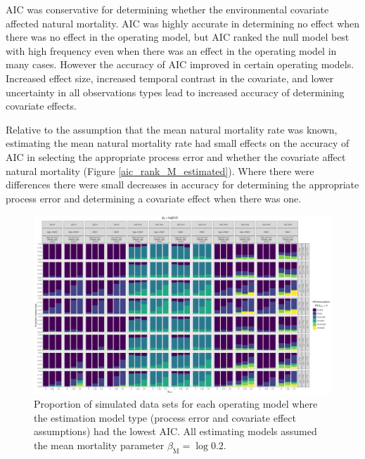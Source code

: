 \documentclass[
  12pt,
]{article}
\begin{document}
AIC was conservative for determining whether the environmental covariate
affected natural mortality. AIC was highly accurate in determining no
effect when there was no effect in the operating model, but AIC ranked
the null model best with high frequency even when there was an effect in
the operating model in many cases. However the accuracy of AIC improved
in certain operating models. Increased effect size, increased temporal
contrast in the covariate, and lower uncertainty in all observations
types lead to increased accuracy of determining covariate effects.

Relative to the assumption that the mean natural mortality rate was
known, estimating the mean natural mortality rate had small effects on
the accuracy of AIC in selecting the appropriate process error and
whether the covariate affect natural mortality (Figure
\ref{aic_rank_M_estimated}). Where there were differences there were
small decreases in accuracy for determining the appropriate process
error and determining a covariate effect when there was one.

\begin{landscape}
\begin{figure}
\caption{Proportion of simulated data sets for each operating model where the estimation model type (process error and covariate effect assumptions) had the lowest AIC. All estimating models assumed the mean mortality parameter $\beta_\text{M} = \log 0.2$.}\label{aic_rank_M_fixed}
\begin{center}
\includegraphics[height = \textheight]{proportion_best_AIC_M_fixed.png}
\end{center}
\end{figure}
\end{landscape}
\end{document}
